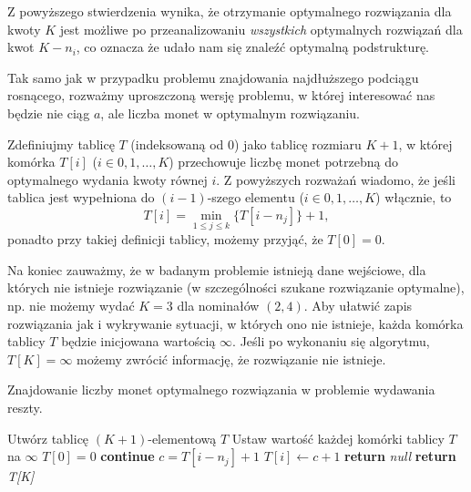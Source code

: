 Z powyższego stwierdzenia wynika, że otrzymanie optymalnego 
rozwiązania dla kwoty $K$ jest możliwe po przeanalizowaniu 
\textit{wszystkich} optymalnych rozwiązań dla kwot $K - n_i$,
co oznacza że udało nam się znaleźć optymalną podstrukturę.

Tak samo jak w przypadku problemu znajdowania najdłuższego 
podciągu rosnącego, rozważmy uproszczoną wersję problemu, 
w której interesować nas będzie nie ciąg $a$, ale 
liczba monet w optymalnym rozwiązaniu. 

Zdefiniujmy tablicę $T$ (indeksowaną od $0$) jako 
tablicę rozmiaru $K + 1$, w której komórka $T[i]$ ($i \in {0, 1, \ldots, K}$)
przechowuje liczbę monet potrzebną do optymalnego wydania kwoty równej $i$.
Z powyższych rozważań
wiadomo, że jeśli tablica jest wypełniona do $(i-1)$-szego
elementu ($i \in {0, 1, \ldots, K}$) włącznie, to 
\begin{equation}
	T[i] = \min_{1 \leq j \leq k}\{T[i - n_j]\} + 1,
	\label{eq:min_change_making_relation}
\end{equation}
ponadto przy takiej definicji tablicy, możemy przyjąć, że $T[0] = 0$.

Na koniec zauważmy, że w badanym problemie
istnieją dane wejściowe, dla których nie 
istnieje rozwiązanie (w szczególności szukane rozwiązanie optymalne),
np. nie możemy wydać $K=3$ dla nominałów $(2, 4)$. 
Aby ułatwić zapis rozwiązania jak i wykrywanie sytuacji, w których
ono nie istnieje, każda komórka tablicy $T$ będzie inicjowana
wartością $\infty$. Jeśli po wykonaniu się algorytmu, $T[K] = \infty$
możemy zwrócić informację, że rozwiązanie nie istnieje.

\begin{algorithm}[H]
	\caption{Znajdowanie liczby monet optymalnego 
		rozwiązania w problemie wydawania reszty.}\label{MinCoinsCountChangeMaking}
	\begin{algorithmic}[1]
		\State Utwórz tablicę $(K+1)$-elementową $T$
		\State Ustaw wartość każdej komórki tablicy $T$ na $\infty$
		\State $T[0] = 0$
		 \textbf{continue}
		\EndIf
		\State $c = T[i - n_j] + 1$
		 $T[i] \gets c + 1$
		\EndIf
		\EndFor
		\EndFor
		 \textbf{return} \textit{null}
		\EndIf
		\State \textbf{return} \textit{T[K]}
		\EndProcedure
	\end{algorithmic}
\end{algorithm}

